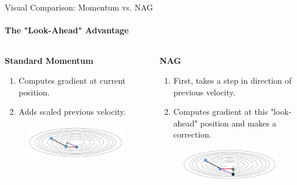 \begin{frame}{Visual Comparison: Momentum vs. NAG}
    \framesubtitle{The "Look-Ahead" Advantage}
    \begin{columns}[T]
        \begin{column}{0.5\textwidth}
            \textbf{Standard Momentum}
            \footnotesize %
            \begin{enumerate}
                \item Computes gradient at current position.
                \item Adds scaled previous velocity.
            \end{enumerate}
            
            \begin{figure}
                \includegraphics[width=\linewidth]{images/standard_momentum.jpg}
            \end{figure}
        \end{column}
        
        \begin{column}{0.5\textwidth}
            \textbf{NAG}
            \footnotesize %
            \begin{enumerate}
                \item First, takes a step in direction of previous velocity.
                \item Computes gradient at this "look-ahead" position and makes a correction.
            \end{enumerate}
            
            \begin{figure}
                \includegraphics[width=\linewidth]{images/nag.png}
            \end{figure}
        \end{column}
    \end{columns}
    
\end{frame}
